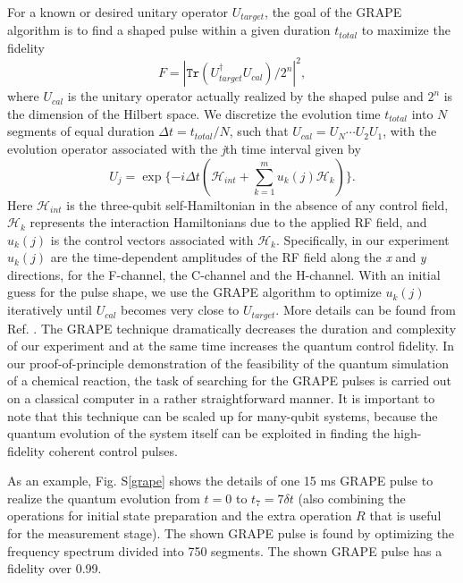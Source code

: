 \documentclass[twocolumn,showpacs,twoside,10pt,prl]{revtex4}
\begin{document}
For a known or desired unitary operator $U_{target}$,
the goal of the GRAPE algorithm is to find a shaped pulse within a given duration $t_{total}$ to maximize the fidelity
\begin{equation}\label{grape_fid}
F =|\texttt{Tr}(U_{target}^{\dagger}U_{cal})/2^n|^2,
\end{equation}
where $U_{cal}$ is the unitary operator actually realized by the shaped pulse and $2^n$ is the dimension of the Hilbert space. We discretize the evolution time $t_{total}$ into $N$ segments of equal duration $\Delta t = t_{total}/N$, such that $U_{cal}=U_N\cdots U_2U_1$, with the evolution operator associated with the \emph{j}th time interval given by
\begin{equation}
U_j=\exp\{-i\Delta t(\mathcal{H}_{int}+\sum_{k=1}^m u_k(j)\mathcal{H}_{k})\}.
\end{equation}
Here $\mathcal{H}_{int}$ is the three-qubit self-Hamiltonian in the absence of any control field, $\mathcal{H}_{k}$ represents the interaction Hamiltonians due to the applied RF field, and $u_k(j)$ is the control vectors associated with $\mathcal{H}_{k}$. Specifically, in our experiment $u_k(j)$ are the time-dependent amplitudes of the RF field along the \emph{x} and \emph{y} directions, for the F-channel, the C-channel and the H-channel.  With an initial guess for the pulse shape, we use the GRAPE algorithm to optimize $u_k(j)$ iteratively until $U_{cal}$ becomes very close to $U_{target}$.  More details can be found from Ref. \cite{grape1-2}. The GRAPE technique dramatically decreases the duration and complexity of our experiment and at the same time increases the quantum control fidelity.  In our proof-of-principle demonstration of the feasibility of the quantum simulation of a chemical reaction, the task of searching for the GRAPE pulses is carried out on a classical computer in a rather straightforward manner. It is important to note that this technique can be scaled up for many-qubit systems, because the quantum evolution of the system itself can be exploited in finding the high-fidelity coherent control pulses.


As an example,  Fig. S\ref{grape} shows the details of one 15 ms GRAPE pulse to realize the quantum evolution from $t=0$ to $t_7=7\delta t$ (also combining the operations for initial state preparation and the extra operation $R$ that is useful for the measurement stage). The shown GRAPE pulse is found by optimizing the frequency spectrum divided into 750 segments. The shown GRAPE pulse has a fidelity over 0.99.
\end{document}
